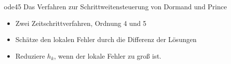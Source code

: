   




\begin{frame}{ode45}
  Das Verfahren zur Schrittweitensteuerung von Dormand und Prince
  \begin{itemize}
  \item Zwei Zeitschrittverfahren, Ordnung 4 und 5
  \item Schätze den lokalen Fehler durch die Differenz der Lösungen
  \item Reduziere $h_k$, wenn der lokale Fehler zu groß ist.
  \end{itemize}
\end{frame}

